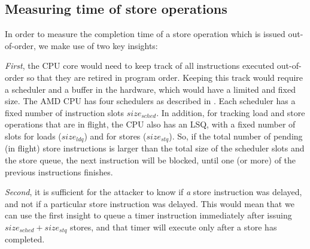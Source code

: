 \subsection{Measuring time of store operations}
\label{subsec:interconnect-sc-store-ops-measuring-time}

In order to measure the completion time of a store operation which is issued out-of-order, we make use of two key insights:

\textit{First}, the CPU core would need to keep track of all instructions executed out-of-order so that they are retired in program order.
Keeping this track would require a scheduler and a buffer in the hardware, which would have a limited and fixed size.
The AMD CPU has four schedulers as described in . Each scheduler has a fixed number of instruction slots $size_{sched}$.
In addition, for tracking load and store operations that are in flight, the CPU also has an LSQ, with a fixed number of slots for loads ($size_{ldq}$) and for stores ($size_{stq}$).
So, if the total number of pending (in flight) store instructions is larger than the total size of the scheduler slots and the store queue, the next instruction will be blocked, until one (or more) of the previous instructions finishes.

\textit{Second}, it is sufficient for the attacker to know if \textit{a} store instruction was delayed, and not if a particular store instruction was delayed.
This would mean that we can use the first insight to queue a timer instruction immediately after issuing $size_{sched} + size_{stq}$ stores, and that timer will execute only after a store has completed.
